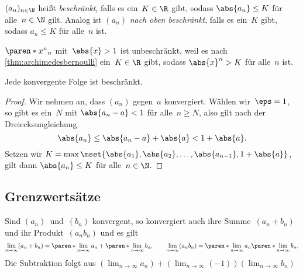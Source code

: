 \documentclass[a4paper]{article}
\begin{document}
\begin{definition}
    $(a_n)_{n\in\N}$ heißt \emph{beschränkt}, falls es ein~$K \in \R$ gibt, sodass $\abs{a_n} \leq K$ für alle~$n \in \N$ gilt. Analog ist $(a_n)$ \emph{nach oben beschränkt}, falls es ein~$K$ gibt, sodass $a_n \leq K$ für alle~$n$ ist.
\end{definition}

\begin{example}
    $\paren*{x^n}_n$ mit~$\abs{x} > 1$ ist unbeschränkt, weil es nach \cref{thm:archimedesbernoulli} ein~$K \in \R$ gibt, sodass $\abs{x}^n > K$ für alle~$n$ ist.
\end{example}

\begin{theorem}\label{thm:bound}
    Jede konvergente Folge ist beschränkt.
\end{theorem}

\begin{proof}
    Wir nehmen an, dass $(a_n)$ gegen~$a$ konvergiert. Wählen wir~$\eps = 1$, so gibt es ein~$N$ mit $\abs{a_n - a} < 1$ für alle~$n \geq N$, also gilt nach der Dreiecksungleichung
    \begin{equation*}
        \abs{a_n} \leq \abs{a_n-a} + \abs{a} < 1 + \abs{a}.
    \end{equation*}
    Setzen wir $K = \max\mset{\abs{a_1}, \abs{a_2}, \dots, \abs{a_{n-1}}, 1+\abs{a}}$, gilt dann $\abs{a_n} \leq K$ für alle~$n \in \N$.
\end{proof}

\subsection{Grenzwertsätze}

\begin{theorem}
    Sind $(a_n)$~und~$(b_n)$ konvergent, so konvergiert auch ihre Summe~$(a_n + b_n)$ und ihr Produkt~$(a_n b_n)$ und es gilt
    \begin{equation*}
        \lim_{n\to\infty} (a_n + b_n) = \paren*{\lim_{n\to\infty} a_n} + \paren*{\lim_{n\to\infty} b_n}, \qquad \lim_{n\to\infty} (a_n b_n) = \paren*{\lim_{n\to\infty} a_n} \paren*{\lim_{n\to\infty} b_n}.
    \end{equation*}
    Die Subtraktion folgt aus $(\lim_{n\to\infty} a_n) + (\lim_{n\to\infty} (-1)) (\lim_{n\to\infty} b_n)$
\end{theorem}
\end{document}
